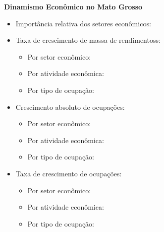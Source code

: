 \documentclass[8pt]{beamer}
\begin{document}
\begin{frame}[label=indice_principal_amz_mt]{}

\textit{\hyperlink{indice_principal}{}}

\textbf{Dinamismo Econômico no Mato Grosso}
\vspace{2mm}

\begin{itemize}

\item{Importância relativa dos setores econômicos: \hyperlink{_amz_mt_importancia_relativa}{}}
\vspace{1mm}

\item{Taxa de crescimento  de massa de rendimentoss:
	\begin{itemize}
	\item{Por setor econômico: \hyperlink{amzmtrkngtxmassaporsetor}{}}
	\item{Por atividade econômica: \hyperlink{amzmtrkngtxmassaporatividade}{}}
	\item{Por tipo de ocupação: \hyperlink{amzmtrkngtxmassaporocupacao}{}}
	\end{itemize}
}
\vspace{1mm}


\item{Crescimento  absoluto de ocupações:
	\begin{itemize}
	\item{Por setor econômico: \hyperlink{amzmtrkngnocuporsetor}{}}
	\item{Por atividade econômica: \hyperlink{amzmtrkngnocuporatividade}{}}
	\item{Por tipo de ocupação: \hyperlink{amzmtrkngnocuporocupacao}{}}
	\end{itemize}
}
\vspace{1mm}

\item{Taxa de crescimento de ocupações:
	\begin{itemize}
	\item{Por setor econômico: \hyperlink{amzmtrkngtxocuporsetor}{}}
	\item{Por atividade econômica: \hyperlink{amzmtrkngtxocuporatividade}{}}
	\item{Por tipo de ocupação: \hyperlink{amzmtrkngtxocuporocupacao}{}}
	\end{itemize}
}
\vspace{1mm}


\end{itemize}
\end{frame}
\end{document}
